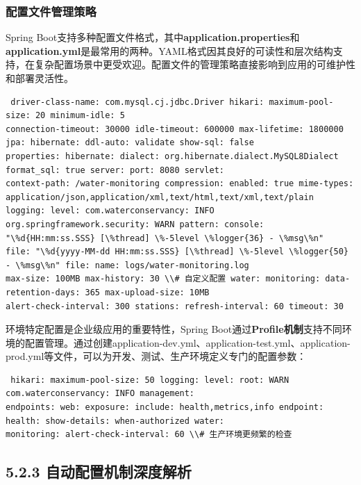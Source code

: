 \subsubsection{配置文件管理策略}\label{ux914dux7f6eux6587ux4ef6ux7ba1ux7406ux7b56ux7565} Spring
Boot支持多种配置文件格式，其中\textbf{application.properties}和\textbf{application.yml}是最常用的两种。YAML格式因其良好的可读性和层次结构支持，在复杂配置场景中更受欢迎。配置文件的管理策略直接影响到应用的可维护性和部署灵活性。
\begin{lstlisting} driver-class-name: com.mysql.cj.jdbc.Driver hikari: maximum-pool-size: 20 minimum-idle: 5
connection-timeout: 30000 idle-timeout: 600000 max-lifetime: 1800000 jpa: hibernate: ddl-auto: validate show-sql: false
properties: hibernate: dialect: org.hibernate.dialect.MySQL8Dialect format_sql: true server: port: 8080 servlet:
context-path: /water-monitoring compression: enabled: true mime-types:
application/json,application/xml,text/html,text/xml,text/plain logging: level: com.waterconservancy: INFO
org.springframework.security: WARN pattern: console: "\%d{HH:mm:ss.SSS} [\%thread] \%-5level \%logger{36} - \%msg\%n"
file: "\%d{yyyy-MM-dd HH:mm:ss.SSS} [\%thread] \%-5level \%logger{50} - \%msg\%n" file: name: logs/water-monitoring.log
max-size: 100MB max-history: 30 \\# 自定义配置 water: monitoring: data-retention-days: 365 max-upload-size: 10MB
alert-check-interval: 300 stations: refresh-interval: 60 timeout: 30 \end{lstlisting} 环境特定配置是企业级应用的重要特性，Spring
Boot通过\textbf{Profile机制}支持不同环境的配置管理。通过创建application-dev.yml、application-test.yml、application-prod.yml等文件，可以为开发、测试、生产环境定义专门的配置参数：
\begin{lstlisting} hikari: maximum-pool-size: 50 logging: level: root: WARN com.waterconservancy: INFO management:
endpoints: web: exposure: include: health,metrics,info endpoint: health: show-details: when-authorized water:
monitoring: alert-check-interval: 60 \\# 生产环境更频繁的检查 \end{lstlisting} \subsection{5.2.3
自动配置机制深度解析}\label{ux81eaux52a8ux914dux7f6eux673aux5236ux6df1ux5ea6ux89e3ux6790-1}
